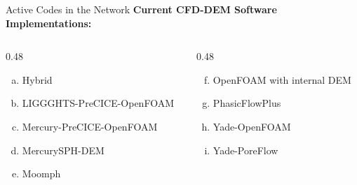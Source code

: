 \begin{frame}{Active Codes in the Network}
    \textbf{Current CFD-DEM Software Implementations:}
    \vspace{0.4cm}
    
    \begin{columns}[T]
        \begin{column}{0.48\textwidth}
            \begin{enumerate}[a)]
                \item {Hybrid}
                \item {LIGGGHTS-PreCICE-OpenFOAM}
                \item {Mercury-PreCICE-OpenFOAM}
                \item {MercurySPH-DEM}
                \item {Moomph}
            \end{enumerate}
        \end{column}
        
        \begin{column}{0.48\textwidth}
            \begin{enumerate}[a)]
                \setcounter{enumi}{5}
                \item {OpenFOAM with internal DEM}
                \item {PhasicFlowPlus}
                \item {Yade-OpenFOAM}
                \item {Yade-PoreFlow}
            \end{enumerate}
        \end{column}
    \end{columns}
\end{frame}

